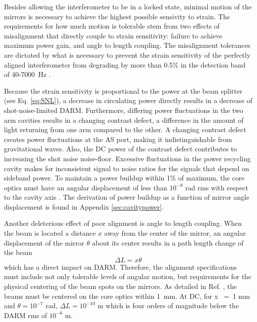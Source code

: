 
Besides allowing the interferometer to be in a locked state, minimal motion of the mirrors is necessary to achieve the highest possible sensivity to strain. The requirements for how much motion is tolerable stem from two effects of misalignment that directly couple to strain sensitivity: failure to achieve maximum power gain, and angle to length coupling. The misalignment tolerances are dictated by what is necessary to prevent the strain sensitivity of the perfectly aligned interferometer from degrading by more than 0.5\% in the detection band of 40-7000~Hz \cite{Fritschel1997Alignment}.

Because the strain sensitivity is proportional to the power at the beam splitter (see Eq. \ref{eq:SNL}), a decrease in circulating power directly results in a decrease of shot-noise-limited DARM. Furthermore, differing power fluctuations in the two arm cavities results in a changing contrast defect, a difference in the amount of light returning from one arm compared to the other. A changing contrast defect creates power fluctuations at the AS port, making it indistinguishable from gravitational waves. Also, the DC power of the contrast defect contributes to increasing the shot noise noise-floor. Excessive fluctuations in the power recycling cavity makes for inconsistent signal to noise ratios for the signals that depend on sideband power. To maintain a power buildup within 1\% of maximum, the core optics must have an angular displacement of less than $10^{-8}$ rad rms with respect to the cavity axis \cite{ISCGroup1998ASC}. The derivation of power buildup as a function of mirror angle displacement is found in Appendix \ref{sec:cavitypower}.

Another deleterious effect of poor alignment is angle to length coupling. 
When the beam is located a distance $x$  away from the center of the mirror, an
angular displacement of the mirror $\theta$ about its center results in a path
length change of the beam
\begin{equation}
\Delta{L} = x \theta
\end{equation}
which has a direct impact on DARM. Therefore, the alignment specifications must include not only tolerable levels of angular motion, but requirements for the physical centering of the beam spots on the mirrors. As detailed in Ref. \cite{ISCGroup1998ASC}, the beams must be centered on the core optics within 1~mm. At DC, for x ~=~1 mm and $\theta = 10^{-7}$ rad, $\Delta{L} = 10^{-10}$ m which is four orders of magnitude below the DARM rms of $10^{-6}$ m. 




